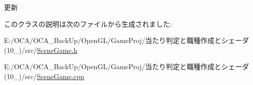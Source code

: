 更新 



このクラスの説明は次のファイルから生成されました\-:\begin{DoxyCompactItemize}
\item 
E\-:/\-O\-C\-A/\-O\-C\-A\-\_\-\-Back\-Up/\-Open\-G\-L/\-Game\-Proj/当たり判定と職種作成とシェーダ(10\-\_)/src/\hyperlink{_scene_game_8h}{Scene\-Game.\-h}\item 
E\-:/\-O\-C\-A/\-O\-C\-A\-\_\-\-Back\-Up/\-Open\-G\-L/\-Game\-Proj/当たり判定と職種作成とシェーダ(10\-\_)/src/\hyperlink{_scene_game_8cpp}{Scene\-Game.\-cpp}\end{DoxyCompactItemize}
